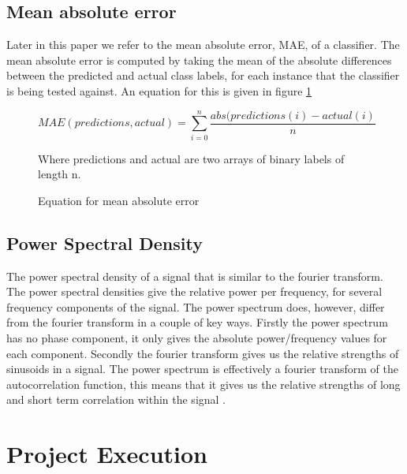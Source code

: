 \documentclass[ %
                    author={Sam Phippen},
                supervisor={Dr. Rafal Bogacz},
                     title={Real time voice activity detectors in noisy personal computing environments},
                  subtitle={},
                    degree={MEng},
                      year={2012} ]{thesis}
\begin{document}
\section{Mean absolute error}

Later in this paper we refer to the mean absolute error, MAE, of a classifier.
The mean absolute error is computed by taking the mean of the absolute
differences between the predicted and actual class labels, for each instance
that the classifier is being tested against. An equation for this is given in
figure \ref{mae-eqn}

\begin{figure}
    \begin{center}
        $$MAE(predictions, actual) = \sum_{i=0}^n\frac{abs(predictions(i)-actual(i)}{n}$$
    \end{center}

    Where predictions and actual are two arrays of binary labels of length n.
    \caption{Equation for mean absolute error}
    \label{mae-eqn}
\end{figure}

\section{Power Spectral Density}

The power spectral density of a signal that is similar to the fourier
transform. The power spectral densities give the relative power per frequency, for
several frequency components of the signal. The power spectrum does, however,
differ from the fourier transform in a couple of key ways. Firstly the power
spectrum has no phase component, it only gives the absolute power/frequency values for
each component. Secondly the fourier transform gives us the relative strengths
of sinusoids in a signal. The power spectrum is effectively a fourier transform
of the autocorrelation function, this means that it gives us the relative
strengths of long and short term correlation within the signal
.\cite{psd}\cite{psd2}



\chapter{Project Execution}
\label{chap:execution}

\vspace{1cm} 
\end{document}
